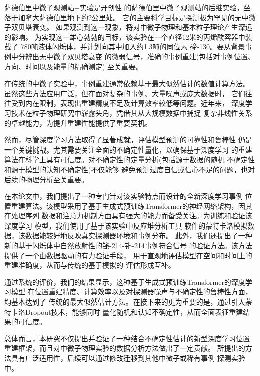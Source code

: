 \begin{cnabstract}

萨德伯里中微子观测站+实验是开创性
的萨德伯里中微子观测站的后继实验，坐落于加拿大萨德伯里地下约2公里处。
它的主要科学目标是探测极为罕见的无中微子双贝塔衰变。
如果观测到这一现象，将对中微子物理和基本粒子理论产生深远的影响。
为实现这一雄心勃勃的目标，该实验在一个直径12米的丙烯酸容器中装载了
780吨液体闪烁体，并计划向其中加入约1.3吨的同位素
碲-130。要从背景事例中分辨出无中微子双贝塔衰变
的微弱信号，准确的事例重建(包括对事例位置、方向、时间以及能量的精确测定)
至关重要。

在传统的中微子实验中，事例重建通常依赖基于最大似然估计的数值计算方法。
虽然这些方法应用广泛，但在面对复杂的事例、大量噪声或庞大数据时，
它们往往受到内在限制，表现出重建精度不足及计算效率较低等问题。近年来，
深度学习技术在粒子物理研究中崭露头角，凭借其从大规模数据中捕捉
复杂非线性关系的卓越能力，为提升重建性能提供了重要契机。

然而，尽管深度学习方法取得了显著成就，评估模型预测的可靠性和鲁棒性
仍是一个关键挑战。尤其需要关注全面的不确定性量化，以确保基于深度学习
的重建算法在科学上具有可信度。对不确定性的定量分析(包括源于数据的随机
不确定性和源于模型的认知不确定性)不仅能够
避免预测过度自信或信心不足的问题，也对后续的物理分析至关重要。

在本论文中，我们提出了一种专门针对该实验特点而设计的全新深度学习事例
位置重建算法。该模型采用了基于生成式预训练Transformer的神经网络架构，因其在处理序列
数据和注意力机制方面具有强大的能力而备受关注。为训练和验证该深度学习
模型，我们使用了基于该实验中反应堆分析工具
软件的蒙特卡洛模拟数据，该数据能较好地反映真实探测器环境和事例分布。
此外，我们还提出了一种新的基于闪烁体中自然放射性的铋-214-钋-214事例符合信号
的验证方法。该方法提供了一个由数据驱动的有力验证手段，
用于直观地评估模型在空间和时间上的重建准确度，从而与传统的基于模拟的
评估形成互补。

通过系统的评价，我们的结果显示，这种基于生成式预训练Transformer的深度学习模型
在位置重建精度、计算效率以及对探测器噪声与不确定性的鲁棒性方面，均基本达到了
传统的最大似然估计方法。在接下来的更为重要的是，通过引入蒙特卡洛Dropout技术，能够同时
量化随机和认知不确定性，从而全面表征重建结果的可信度。

总体而言，本研究不仅提出并验证了一种结合不确定性估计的新型深度学习位置
重建框架，而且对中微子物理实验的数据分析方法做出了一定贡献。
所提出的方法具有广泛适用性，后续可以通过修改迁移到其他中微子或稀有事例
探测实验中。


\end{cnabstract}

